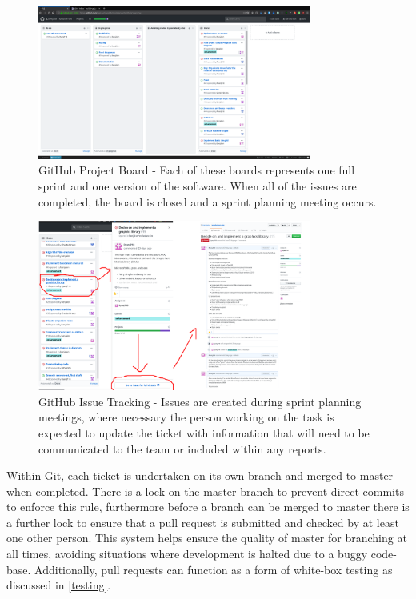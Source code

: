 \documentclass[a4paper, oneside, 11pt]{report}
\begin{document}
\begin{figure}[H]
	\centering
	\includegraphics[width=0.8\textwidth]{gitproj}
	\caption{GitHub Project Board - Each of these boards represents one full sprint and one version of the software. When all of the issues are completed, the board is closed and a sprint planning meeting occurs.}\label{gitboard}
\end{figure}

\begin{figure}[H]
	\centering
	\includegraphics[width=0.8\textwidth]{gitissuetrack}
	\caption{GitHub Issue Tracking - Issues are created during sprint planning meetings, where necessary the person working on the task is expected to update the ticket with information that will need to be communicated to the team or included within any reports.}\label{gitissue}
\end{figure}

Within Git, each ticket is undertaken on its own branch and merged to master when completed. There is a lock on the master branch to prevent direct commits to enforce this rule, furthermore before a branch can be merged to master there is a further lock to ensure that a pull request is submitted and checked by at least one other person. This system helps ensure the quality of master for branching at all times, avoiding situations where development is halted due to a buggy code-base. Additionally, pull requests can function as a form of white-box testing as discussed in \ref{testing}.
\end{document}
